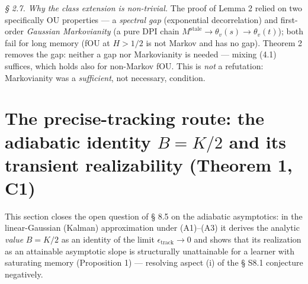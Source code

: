 \documentclass[12pt]{iopart}
\providecommand{\texorpdfstring}[2]{#1}
\begin{document}
\emph{§ 2.7. Why the class extension is non-trivial.} The proof of Lemma 2 relied on two specifically OU properties --- a \emph{spectral gap} (exponential decorrelation) and first-order \emph{Gaussian Markovianity} (a pure DPI chain \(M^{\text{stale}} \to \theta_v(s) \to \theta_v(t)\)); both fail for long memory (fOU at \(H > 1/2\) is not Markov and has no gap). Theorem 2 removes the gap: neither a gap nor Markovianity is needed --- mixing (4.1) suffices, which holds also for non-Markov fOU. This is \emph{not} a refutation: Markovianity was a \emph{sufficient}, not necessary, condition.



\section{\texorpdfstring{The precise-tracking route: the adiabatic identity \(B=K/2\) and its transient realizability (Theorem 1, C1)}{The precise-tracking route: the adiabatic identity B=K/2 and its transient realizability (Theorem 1, C1)}}\label{the-precise-tracking-route-the-adiabatic-identity-bk2-and-its-transient-realizability-theorem-1-c1}



This section closes the open question of § 8.5 \cite{Andriishin2026b} on the adiabatic asymptotics: in the linear-Gaussian (Kalman) approximation under (A1)--(A3) it derives the analytic \emph{value} \(B = K/2\) as an identity of the limit \(\epsilon_{\text{track}}\to 0\) and shows that its realization as an attainable asymptotic slope is structurally unattainable for a learner with saturating memory (Proposition 1) --- resolving aspect (i) of the § S8.1 conjecture negatively.
\end{document}
